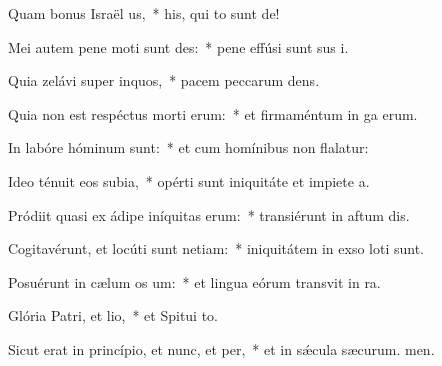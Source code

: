 \item Quam bonus Israël us,~* his, qui to sunt de!
\item Mei autem pene moti sunt des:~* pene effúsi sunt sus i.
\item Quia zelávi super inquos,~* pacem peccarum dens.
\item Quia non est respéctus morti erum:~* et firmaméntum in ga erum.
\item In labóre hóminum  sunt:~* et cum homínibus non flalatur:
\item Ideo ténuit eos subia,~* opérti sunt iniquitáte et impiete a.
\item Pródiit quasi ex ádipe iníquitas erum:~* transiérunt in aftum dis.
\item Cogitavérunt, et locúti sunt netiam:~* iniquitátem in exso loti sunt.
\item Posuérunt in cælum os um:~* et lingua eórum transvit in ra.
\item Glória Patri, et lio,~* et Spitui to.
\item Sicut erat in princípio, et nunc, et per,~* et in sǽcula sæcurum. men.
